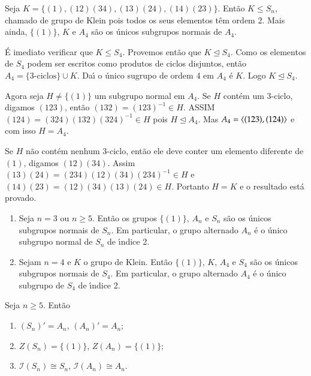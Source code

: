 \begin{teorema}
	Seja $K = \{(1), (12)(34), (13)(24), (14)(23)\}$. Ent\~ao $K \le S_n$, chamado de grupo de Klein pois todos os seus elementos t\^em ordem 2. Mais ainda, $\{(1)\}$, $K$ e $A_4$ s\~ao os \'unicos subgrupos normais de $A_4$.
\end{teorema}
\begin{prova}
	\'E imediato verificar que $K \le S_4$. Provemos ent\~ao que $K \unlhd S_4$. Como os elementos de $S_4$ podem ser escritos como produtos de ciclos disjuntos, ent\~ao $A_4 = \{3\mbox{-ciclos}\} \cup K$. Da{\'\i} o \'unico sugrupo de ordem 4 em $A_4$ \'e $K$. Logo $K \unlhd S_4$.

	Agora seja $H \ne \{(1)\}$ um subgrupo normal em $A_4$. Se $H$ cont\'em um 3-ciclo, digamos $(1 2 3)$, ent\~ao $(1 3 2) = (1 2 3)^{-1} \in H$. ASSIM $(1 2 4) = (3 2 4)(1 3 2)(3 2 4)^{-1} \in H$ pois $H \unlhd A_4$. Mas $A_4 = \langle{(1 2 3), (1 2 4)}\rangle$ e com isso $H = A_4$.

	Se $H$ n\~ao cont\'em nenhum 3-ciclo, ent\~ao ele deve conter um elemento diferente de $(1)$, digamos $(1 2)(3 4)$. Assim $(1 3)(2 4) = (2 3 4)(1 2)(3 4)(2 3 4)^{-1} \in H$ e $(1 4)(2 3) = (1 2)(3 4)(1 3)(2 4) \in H$. Portanto $H = K$ e o resultado est\'a provado.
\end{prova}

\begin{corolario}
	\begin{enumerate}
		\item Seja $n = 3$ ou $n \ge 5$. Ent\~ao os grupos $\{(1)\}$, $A_n$ e $S_n$ s\~ao os \'unicos subgrupos normais de $S_n$. Em particular, o grupo alternado $A_n$ \'e o \'unico subgrupo normal de $S_n$ de {\'\i}ndice 2.

		\item Sejam $n = 4$ e $K$ o grupo de Klein. Ent\~ao $\{(1)\}$, $K$, $A_4$ e $S_4$ s\~ao os \'unicos subgrupos normais de $S_4$. Em particular, o grupo alternado $A_4$ \'e o \'unico subgrupo de $S_4$ de {\'\i}ndice 2.
	\end{enumerate}
\end{corolario}

\begin{corolario}
	Seja $n \ge 5$. Ent\~ao
	\begin{enumerate}
		\item $(S_n)' = A_n$, $(A_n)' = A_n$;

		\item $Z(S_n) = \{(1)\}$, $Z(A_n) = \{(1)\}$;

		\item $\mathcal{I}(S_n) \cong S_n$, $\mathcal{I}(A_n) \cong A_n$.
	\end{enumerate}
\end{corolario}

























